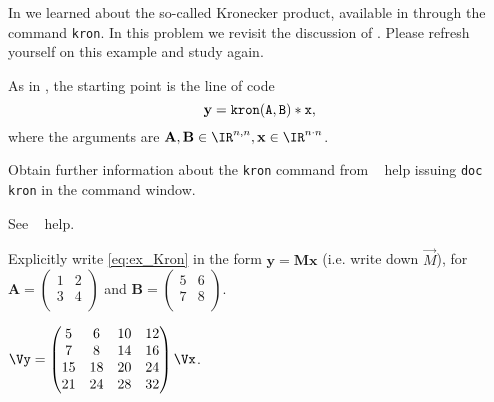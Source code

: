 
\renewcommand{\chpt}{ch_matvec}

\begin{problem} 
\label{prb:Kron}

In  we learned about the so-called Kronecker product, available
in \matlab{} through the command \texttt{kron}. In this problem we revisit the
discussion of . Please refresh yourself on this example and
study  again. 

As in , the starting point is the line of \matlab{} code
\begin{equation} \label{eq:ex_Kron}
  \mathbf{y}=\tt{kron(A,B)*x},
\end{equation} 
where the arguments are $\mathbf{A},\mathbf{B} \in \IR^{n,n}, \mathbf{x} \in \IR^{n \cdot n}$.


\begin{subproblem}[1] \label{subprb:Kron_1}
Obtain further information about the \texttt{kron} command from \Matlab~ help
issuing \texttt{doc kron} in the \matlab{} command window. 

\begin{solution}
See \Matlab~ help.
\end{solution}
\end{subproblem}


\begin{subproblem}[1] \label{subprb:Kron_2}
Explicitly write \cref{eq:ex_Kron}
in the form $\mathbf{y}=\mathbf{M} \mathbf{x}$ (i.e. write down $\vec{M}$), for
$\mathbf{A}=\begin{pmatrix}
         1 & 2   \\
         3 & 4   \\
 \end{pmatrix}$
and
$\mathbf{B}=\begin{pmatrix}
         5 & 6   \\
         7 & 8   \\
 \end{pmatrix}$.

\begin{solution}
$\Vy=\begin{pmatrix}
         5 & 6 & 10 & 12  \\
         7 & 8 & 14 & 16  \\
         15 & 18 & 20 & 24  \\
         21 & 24 & 28 & 32  \\
 \end{pmatrix}\Vx$.
\end{solution}
\end{subproblem}


\end{problem}
